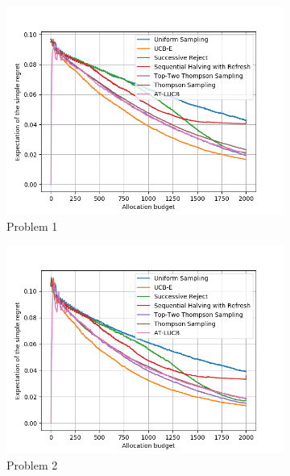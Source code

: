 \documentclass[twoside,11pt]{article}
\begin{document}
\begin{figure}[ht]
  \centering
  \begin{subfigure}[t]{0.2\textwidth}
    \centering\includegraphics[width=\textwidth]{img/bai/setting1.png}
    \caption{Problem 1}
  \end{subfigure}%
  \begin{subfigure}[t]{0.2\textwidth}
    \centering\includegraphics[width=\textwidth]{img/bai/setting2.png}
    \caption{Problem 2}
  \end{subfigure}
  \begin{subfigure}[t]{0.2\textwidth}

\end{subfigure}
\end{figure}
\end{document}
